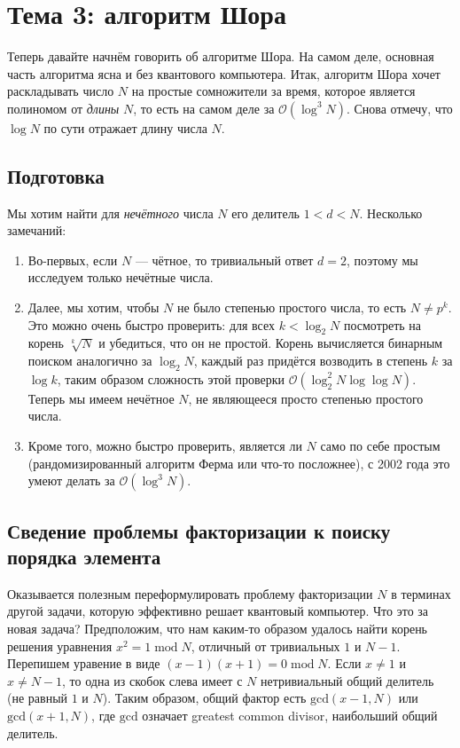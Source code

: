 \documentclass[12pt]{article}
\begin{document}
\section*{Тема 3: алгоритм Шора}
Теперь давайте начнём говорить об алгоритме Шора. На самом деле, основная часть алгоритма ясна и без квантового компьютера. Итак, алгоритм Шора хочет раскладывать число $N$ на простые сомножители за время, которое является полиномом от {\it длины} $N$, то есть на самом деле за $\mathcal{O}(\log^3 N)$. Снова отмечу, что $\log N$ по сути отражает длину числа $N$.

\subsection*{Подготовка}
Мы хотим найти для {\it нечётного} числа $N$ его делитель $1 < d < N$. Несколько замечаний:
\begin{enumerate}
\item Во-первых, если $N$ --- чётное, то тривиальный ответ $d = 2$, поэтому мы исследуем только нечётные числа. 
\item Далее, мы хотим, чтобы $N$ не было степенью простого числа, то есть $N \neq p^k$. Это можно очень быстро проверить: для всех $k < \log_2 N$ посмотреть на корень $\sqrt[k]{N}$ и убедиться, что он не простой. Корень вычисляется бинарным поиском аналогично за $\log_2 N$, каждый раз придётся возводить в степень $k$ за $\log k$, таким образом сложность этой проверки $\mathcal{O}(\log_2^2 N \log \log N)$. Теперь мы имеем нечётное $N$, не являющееся просто степенью простого числа. 
\item Кроме того, можно быстро проверить, является ли $N$ само по себе простым (рандомизированный алгоритм Ферма или что-то посложнее), с 2002 года это умеют делать за $\mathcal{O}(\log^3 N)$.
\end{enumerate}

\subsection*{Сведение проблемы факторизации к поиску порядка элемента}
Оказывается полезным переформулировать проблему факторизации $N$ в терминах другой задачи, которую эффективно решает квантовый компьютер. Что это за новая задача? Предположим, что нам каким-то образом удалось найти корень решения уравнения $x^2 = 1\;\mbox{mod}\;N$, отличный от тривиальных $1$ и $N - 1$. Перепишем уравение в виде $(x - 1)(x + 1) = 0\;\mbox{mod}\;N$. Если $x \neq 1$ и $x \neq N - 1$, то одна из скобок слева имеет с $N$ нетривиальный общий делитель (не равный $1$ и $N$). Таким образом, общий фактор есть $\mbox{gcd}(x - 1, N)$ или $\mbox{gcd}(x + 1, N)$, где $\mbox{gcd}$ означает greatest common divisor, наибольший общий делитель. 
\end{document}
